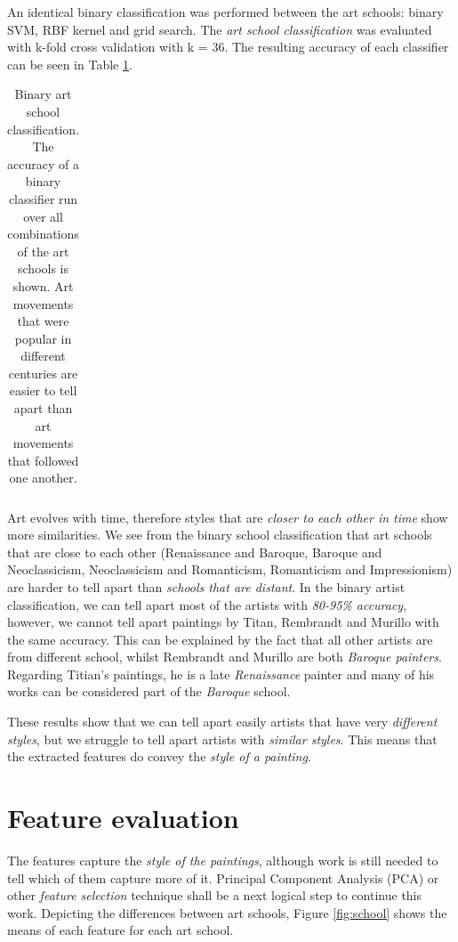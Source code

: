 \documentclass[11pt,a4paper,twoside,openright]{report}
\begin{document}
An identical binary classification was performed between the art schools:
binary SVM, RBF kernel and grid search.  The \emph{art school classification}
was evaluated with k-fold cross validation with k = 36.  The resulting accuracy
of each classifier can be seen in Table \ref{tab:foldsch}.

\begin{table}[ptb]
\centering
\begin{tabular}{r||r|r|r|r|r}
\toprule

\bottomrule
\end{tabular}
\caption[Binary art school classification]{Binary art school classification.
The accuracy of a binary classifier run over all combinations of the art
schools is shown.  Art movements that were popular in different centuries are
easier to tell apart than art movements that followed one another.}
\label{tab:foldsch}
\end{table}

Art evolves with time, therefore styles that are \emph{closer to each other in
time} show more similarities.  We see from the binary school classification
that art schools that are close to each other (Renaissance and Baroque, Baroque
and Neoclassicism, Neoclassicism and Romanticism, Romanticism and
Impressionism) are harder to tell apart than \emph{schools that are distant}.
In the binary artist classification, we can tell apart most of the artists with
\emph{80-95\% accuracy}, however, we cannot tell apart paintings by Titan,
Rembrandt and Murillo with the same accuracy.  This can be explained by the
fact that all other artists are from different school, whilst Rembrandt and
Murillo are both \emph{Baroque painters}.  Regarding Titian's paintings, he is
a late \emph{Renaissance} painter and many of his works can be considered part
of the \emph{Baroque} school.

These results show that we can tell apart easily artists that have very
\emph{different styles}, but we struggle to tell apart artists with
\emph{similar styles}.  This means that the extracted features do convey the
\emph{style of a painting}.

\section{Feature evaluation}

The features capture the \emph{style of the paintings}, although work is still
needed to tell which of them capture more of it.  Principal Component Analysis
(PCA) or other \emph{feature selection} technique shall be a next logical step
to continue this work.  Depicting the differences between art schools, Figure
\ref{fig:school} shows the means of each feature for each art school.
\end{document}
